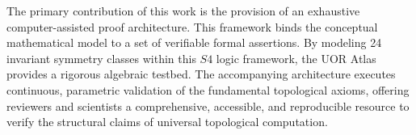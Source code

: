 The primary contribution of this work is the provision of an exhaustive computer-assisted proof architecture. This framework binds the conceptual mathematical model to a set of verifiable formal assertions. By modeling 24 invariant symmetry classes within this $S4$ logic framework, the UOR Atlas provides a rigorous algebraic testbed. The accompanying architecture executes continuous, parametric validation of the fundamental topological axioms, offering reviewers and scientists a comprehensive, accessible, and reproducible resource to verify the structural claims of universal topological computation.
